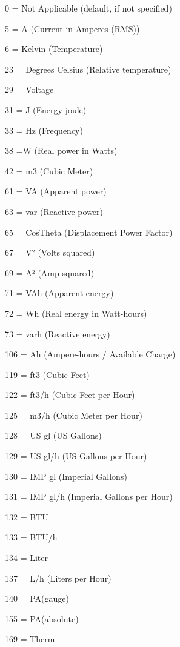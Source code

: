 0 = Not Applicable (default, if not specified)

5 = A (Current in Amperes (R\+MS))

6 = Kelvin (Temperature)

23 = Degrees Celsius (Relative temperature)

29 = Voltage

31 = J (Energy joule)

33 = Hz (Frequency)

38 =W (Real power in Watts)

42 = m3 (Cubic Meter)

61 = VA (Apparent power)

63 = var (Reactive power)

65 = Cos\+Theta (Displacement Power Factor)

67 = V² (Volts squared)

69 = A² (Amp squared)

71 = V\+Ah (Apparent energy)

72 = Wh (Real energy in Watt-\/hours)

73 = varh (Reactive energy)

106 = Ah (Ampere-\/hours / Available Charge)

119 = ft3 (Cubic Feet)

122 = ft3/h (Cubic Feet per Hour)

125 = m3/h (Cubic Meter per Hour)

128 = US gl (US Gallons)

129 = US gl/h (US Gallons per Hour)

130 = I\+MP gl (Imperial Gallons)

131 = I\+MP gl/h (Imperial Gallons per Hour)

132 = B\+TU

133 = B\+T\+U/h

134 = Liter

137 = L/h (Liters per Hour)

140 = P\+A(gauge)

155 = P\+A(absolute)

169 = Therm 